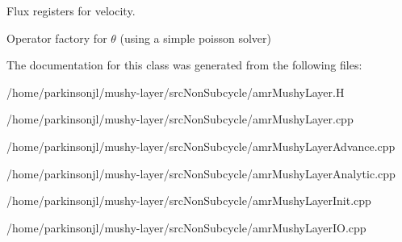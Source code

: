 Flux registers for velocity. 

Operator factory for $ \theta $ (using a simple poisson solver) 

The documentation for this class was generated from the following files\-:\begin{DoxyCompactItemize}
\item 
/home/parkinsonjl/mushy-\/layer/src\-Non\-Subcycle/amr\-Mushy\-Layer.\-H\item 
/home/parkinsonjl/mushy-\/layer/src\-Non\-Subcycle/amr\-Mushy\-Layer.\-cpp\item 
/home/parkinsonjl/mushy-\/layer/src\-Non\-Subcycle/amr\-Mushy\-Layer\-Advance.\-cpp\item 
/home/parkinsonjl/mushy-\/layer/src\-Non\-Subcycle/amr\-Mushy\-Layer\-Analytic.\-cpp\item 
/home/parkinsonjl/mushy-\/layer/src\-Non\-Subcycle/amr\-Mushy\-Layer\-Init.\-cpp\item 
/home/parkinsonjl/mushy-\/layer/src\-Non\-Subcycle/amr\-Mushy\-Layer\-I\-O.\-cpp\end{DoxyCompactItemize}
